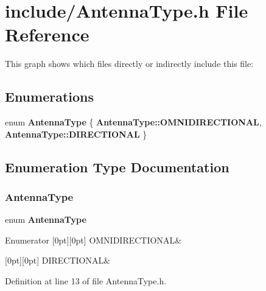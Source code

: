 \section{include/\+Antenna\+Type.h File Reference}
\label{_antenna_type_8h}
This graph shows which files directly or indirectly include this file\+:
\subsection*{Enumerations}
\begin{DoxyCompactItemize}
\item 
enum \textbf{ Antenna\+Type} \{ \textbf{ Antenna\+Type\+::\+O\+M\+N\+I\+D\+I\+R\+E\+C\+T\+I\+O\+N\+AL}, 
\textbf{ Antenna\+Type\+::\+D\+I\+R\+E\+C\+T\+I\+O\+N\+AL}
 \}
\end{DoxyCompactItemize}


\subsection{Enumeration Type Documentation}
\mbox{\label{_antenna_type_8h_a7b678b5cb9dedc607131200119d96b16}} 
\subsubsection{Antenna\+Type}
{\footnotesize\ttfamily enum \textbf{ Antenna\+Type}\hspace{0.3cm}{\ttfamily [strong]}}

\begin{DoxyEnumFields}{Enumerator}
[0pt][0pt]{}\mbox{\label{_antenna_type_8h_a7b678b5cb9dedc607131200119d96b16a8ff57fa72952e98025e600a041b8b8de}} 
O\+M\+N\+I\+D\+I\+R\+E\+C\+T\+I\+O\+N\+AL&\\
\hline

[0pt][0pt]{}\mbox{\label{_antenna_type_8h_a7b678b5cb9dedc607131200119d96b16ab6f2249394a4def60a78b342dcc925b9}} 
D\+I\+R\+E\+C\+T\+I\+O\+N\+AL&\\
\hline

\end{DoxyEnumFields}


Definition at line 13 of file Antenna\+Type.\+h.

